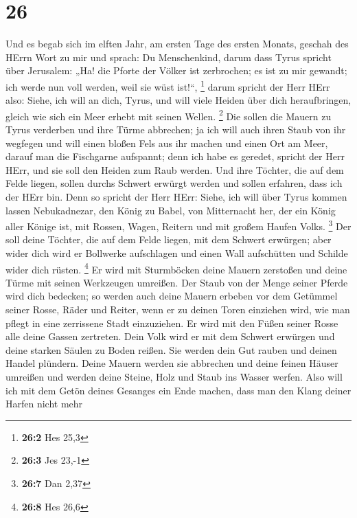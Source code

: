 \hypertarget{section-25}{%
\section{26}\label{section-25}}

 Und es begab sich im elften Jahr, am ersten Tage des
ersten Monats, geschah des HErrn Wort zu mir und sprach: 
Du Menschenkind, darum dass Tyrus spricht über Jerusalem: „Ha! die
Pforte der Völker ist zerbrochen; es ist zu mir gewandt; ich werde nun
voll werden, weil sie wüst ist!{}``, \footnote{\textbf{26:2} Hes 25,3}
 darum spricht der Herr HErr also: Siehe, ich will an
dich, Tyrus, und will viele Heiden über dich heraufbringen, gleich wie
sich ein Meer erhebt mit seinen Wellen. \footnote{\textbf{26:3} Jes
  23,-1}  Die sollen die Mauern zu Tyrus verderben und
ihre Türme abbrechen; ja ich will auch ihren Staub von ihr wegfegen und
will einen bloßen Fels aus ihr machen  und einen Ort am
Meer, darauf man die Fischgarne aufspannt; denn ich habe es geredet,
spricht der Herr HErr, und sie soll den Heiden zum Raub werden.
 Und ihre Töchter, die auf dem Felde liegen, sollen durchs
Schwert erwürgt werden und sollen erfahren, dass ich der HErr bin.
 Denn so spricht der Herr HErr: Siehe, ich will über Tyrus
kommen lassen Nebukadnezar, den König zu Babel, von Mitternacht her, der
ein König aller Könige ist, mit Rossen, Wagen, Reitern und mit großem
Haufen Volks. \footnote{\textbf{26:7} Dan 2,37}  Der soll
deine Töchter, die auf dem Felde liegen, mit dem Schwert erwürgen; aber
wider dich wird er Bollwerke aufschlagen und einen Wall aufschütten und
Schilde wider dich rüsten. \footnote{\textbf{26:8} Hes 26,6}
 Er wird mit Sturmböcken deine Mauern zerstoßen und deine
Türme mit seinen Werkzeugen umreißen.  Der Staub von der
Menge seiner Pferde wird dich bedecken; so werden auch deine Mauern
erbeben vor dem Getümmel seiner Rosse, Räder und Reiter, wenn er zu
deinen Toren einziehen wird, wie man pflegt in eine zerrissene Stadt
einzuziehen.  Er wird mit den Füßen seiner Rosse alle
deine Gassen zertreten. Dein Volk wird er mit dem Schwert erwürgen und
deine starken Säulen zu Boden reißen.  Sie werden dein
Gut rauben und deinen Handel plündern. Deine Mauern werden sie abbrechen
und deine feinen Häuser umreißen und werden deine Steine, Holz und Staub
ins Wasser werfen.  Also will ich mit dem Getön deines
Gesanges ein Ende machen, dass man den Klang deiner Harfen nicht mehr
